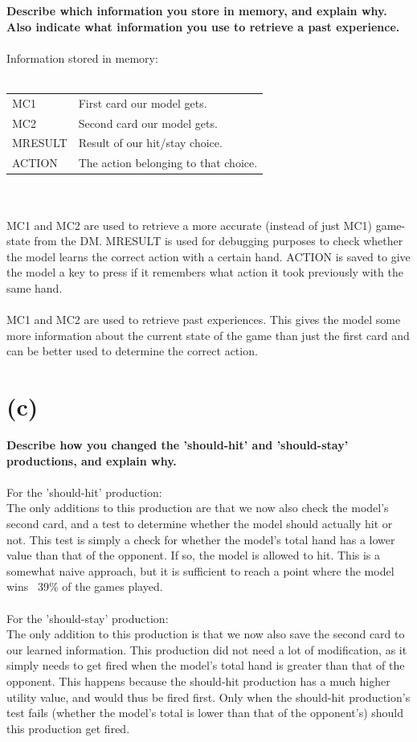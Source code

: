 \documentclass[11pt,a4paper,titlepage]{article}
\begin{document}
\textbf{Describe which information you store in memory, and explain
  why. Also indicate what information you use to retrieve a past
  experience.}
\\~\\
Information stored in memory:\\~\\
\begin{tabular}{@{$\bullet$}ll}
MC1 & First card our model gets.\\ 
MC2 & Second card our model gets.\\
MRESULT & Result of our hit/stay choice.\\
ACTION & The action belonging to that choice.\\
\end{tabular}
\\~\\
MC1 and MC2 are used to retrieve a more accurate (instead of just MC1)
game-state from the DM. MRESULT is used for debugging purposes to
check whether the model learns the correct action with a certain hand.
ACTION is saved to give the model a key to press if it remembers what
action it took previously with the same hand.
\\~\\
MC1 and MC2 are used to retrieve past experiences. This gives the
model some more information about the current state of the game than
just the first card and can be better used to determine the correct
action.
\section{(c)}
\label{sec:c}

\textbf{Describe how you changed the 'should-hit' and 'should-stay'
  productions, and explain why.}
\\~\\
For the 'should-hit' production: \\
The only additions to this production are that we now also check the
model's second card, and a test to determine whether the model should
actually hit or not. This test is simply a check for whether the
model's total hand has a lower value than that of the opponent. If so,
the model is allowed to hit. This is a somewhat naive approach, but it
is sufficient to reach a point where the model wins ~39\% of the games
played.
\\~\\
For the 'should-stay' production: \\
The only addition to this production is that we now also save the
second card to our learned information.  This production did not need
a lot of modification, as it simply needs to get fired when the
model's total hand is greater than that of the opponent. This happens
because the should-hit production has a much higher utility value, and
would thus be fired first. Only when the should-hit production's test
fails (whether the model's total is lower than that of the opponent's)
should this production get fired.
\end{document}
